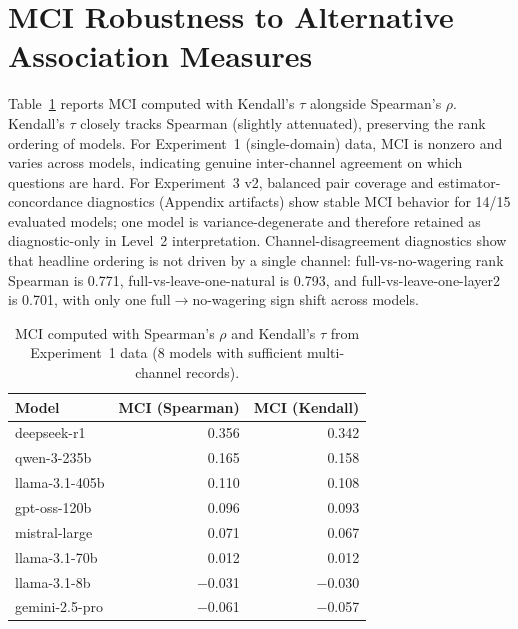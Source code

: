 \documentclass[10pt]{article}
\begin{document}
\section{MCI Robustness to Alternative Association Measures}
\label{app:mci-robust}

Table~\ref{tab:mci-robustness} reports MCI computed with Kendall's $\tau$ alongside Spearman's $\rho$. Kendall's $\tau$ closely tracks Spearman (slightly attenuated), preserving the rank ordering of models. For Experiment~1 (single-domain) data, MCI is nonzero and varies across models, indicating genuine inter-channel agreement on which questions are hard. For Experiment~3 v2, balanced pair coverage and estimator-concordance diagnostics (Appendix artifacts) show stable MCI behavior for 14/15 evaluated models; one model is variance-degenerate and therefore retained as diagnostic-only in Level~2 interpretation. Channel-disagreement diagnostics show that headline ordering is not driven by a single channel: full-vs-no-wagering rank Spearman is 0.771, full-vs-leave-one-natural is 0.793, and full-vs-leave-one-layer2 is 0.701, with only one full$\rightarrow$no-wagering sign shift across models.

\begin{table}[h]
\centering
\caption{MCI computed with Spearman's $\rho$ and Kendall's $\tau$ from Experiment~1 data (8 models with sufficient multi-channel records).}
\label{tab:mci-robustness}
\small
\begin{tabular}{lrr}
\toprule
Model & MCI (Spearman) & MCI (Kendall) \\
\midrule
deepseek-r1 & 0.356 & 0.342 \\
qwen-3-235b & 0.165 & 0.158 \\
llama-3.1-405b & 0.110 & 0.108 \\
gpt-oss-120b & 0.096 & 0.093 \\
mistral-large & 0.071 & 0.067 \\
llama-3.1-70b & 0.012 & 0.012 \\
llama-3.1-8b & $-$0.031 & $-$0.030 \\
gemini-2.5-pro & $-$0.061 & $-$0.057 \\
\bottomrule
\end{tabular}
\end{table}

\end{document}
